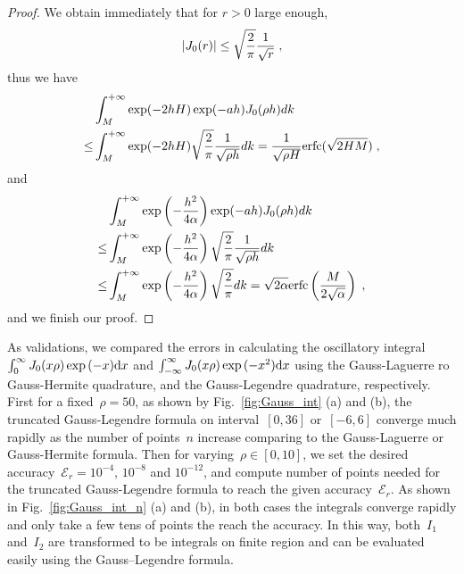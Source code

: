\begin{proof}
We obtain immediately that for $r>0$ large enough,     
\begin{equation*}
   \left\lvert J_0(r)\right\rvert\leq \sqrt{\frac{2}{\pi}} \frac{1}{\sqrt{r}}\;, 
\end{equation*}
thus we have 
\begin{align*}
   & \int_M^{+\infty}  \exp(-2hH)\exp(-ah)  J_0(\rho h)d k \\
\leq & \int_M^{+\infty}  \exp(-2hH)\sqrt{\frac{2}{\pi}} \frac{1}{\sqrt{\rho h}} d k=\frac{1}{\sqrt{\rho H}}\mathrm{erfc}(\sqrt{2HM})\;,
\end{align*}
and 
\begin{align*}
  &\int_M^{+\infty}  \exp\left(-\frac{h^2}{4\alpha}\right)  \exp(-ah)  J_0(\rho h)d k \\
  \leq &\int_M^{+\infty} \exp\left(-\frac{h^2}{4\alpha}\right)\sqrt{\frac{2}{\pi}} \frac{1}{\sqrt{\rho h}} d k\\ 
  \leq &\int_M^{+\infty} \exp\left(-\frac{h^2}{4\alpha}\right)\sqrt{\frac{2}{\pi}} d k=\sqrt{2\alpha} \mathrm{erfc}\left(\frac{M}{2\sqrt{\alpha}}\right)\;,
\end{align*}
and we finish our proof.
\end{proof}

As validations, we compared the errors in calculating the oscillatory integral $\int_0^{\infty} J_0(x \rho) \exp{(-x)} \mathrm{d}x$ and $\int_{-\infty}^{\infty} J_0(x \rho) \exp{(-x^2)} \mathrm{d}x$ using the Gauss-Laguerre ro Gauss-Hermite quadrature, and the Gauss-Legendre quadrature, respectively.
First for a fixed~$\rho = 50$, as shown by Fig.~\ref{fig:Gauss_int} (a) and (b), the truncated Gauss-Legendre formula on interval~$[0, 36]$ or~$[-6, 6]$ converge much rapidly as the number of points~$n$ increase comparing to the Gauss-Laguerre or Gauss-Hermite formula.
Then for varying~$\rho \in [0, 10]$, we set the desired accuracy~$\mathcal{E}_r = 10^{-4}$, $10^{-8}$ and $10^{-12}$, and compute number of points needed for the truncated Gauss-Legendre formula to reach the given accuracy~$\mathcal{E}_r$.
As shown in Fig.~\ref{fig:Gauss_int_n} (a) and (b), in both cases the integrals converge rapidly and only take a few tens of points the reach the accuracy.
In this way, both~$I_1$ and~$I_2$ are transformed to be integrals on finite region and can be evaluated easily using the Gauss–Legendre formula.

